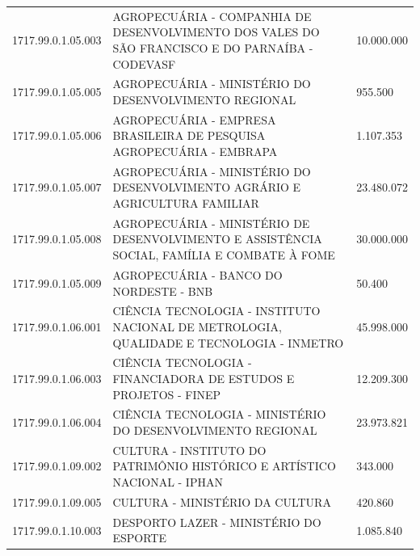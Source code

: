 \documentclass{article}
\begin{document}
\begin{longtable}[c]{m{2cm}|m{13cm}|m{2cm}}
\multicolumn{1}{C{2cm}|}{1717.99.0.1.05.003} & \multicolumn{1}{L{13cm}|}{AGROPECUÁRIA - COMPANHIA DE DESENVOLVIMENTO DOS VALES DO SÃO FRANCISCO E DO PARNAÍBA - CODEVASF} & \multicolumn{1}{R{2cm}}{10.000.000} \\
\multicolumn{1}{C{2cm}|}{1717.99.0.1.05.005} & \multicolumn{1}{L{13cm}|}{AGROPECUÁRIA - MINISTÉRIO DO DESENVOLVIMENTO REGIONAL} & \multicolumn{1}{R{2cm}}{955.500} \\
\multicolumn{1}{C{2cm}|}{1717.99.0.1.05.006} & \multicolumn{1}{L{13cm}|}{AGROPECUÁRIA - EMPRESA BRASILEIRA DE PESQUISA AGROPECUÁRIA - EMBRAPA} & \multicolumn{1}{R{2cm}}{1.107.353} \\
\multicolumn{1}{C{2cm}|}{1717.99.0.1.05.007} & \multicolumn{1}{L{13cm}|}{AGROPECUÁRIA - MINISTÉRIO DO DESENVOLVIMENTO AGRÁRIO E AGRICULTURA FAMILIAR} & \multicolumn{1}{R{2cm}}{23.480.072} \\
\multicolumn{1}{C{2cm}|}{1717.99.0.1.05.008} & \multicolumn{1}{L{13cm}|}{AGROPECUÁRIA - MINISTÉRIO DE DESENVOLVIMENTO E ASSISTÊNCIA SOCIAL, FAMÍLIA E COMBATE À FOME} & \multicolumn{1}{R{2cm}}{30.000.000} \\
\multicolumn{1}{C{2cm}|}{1717.99.0.1.05.009} & \multicolumn{1}{L{13cm}|}{AGROPECUÁRIA - BANCO DO NORDESTE - BNB} & \multicolumn{1}{R{2cm}}{50.400} \\
\multicolumn{1}{C{2cm}|}{1717.99.0.1.06.001} & \multicolumn{1}{L{13cm}|}{CIÊNCIA TECNOLOGIA - INSTITUTO NACIONAL DE METROLOGIA, QUALIDADE E TECNOLOGIA - INMETRO} & \multicolumn{1}{R{2cm}}{45.998.000} \\
\multicolumn{1}{C{2cm}|}{1717.99.0.1.06.003} & \multicolumn{1}{L{13cm}|}{CIÊNCIA TECNOLOGIA - FINANCIADORA DE ESTUDOS E PROJETOS - FINEP} & \multicolumn{1}{R{2cm}}{12.209.300} \\
\multicolumn{1}{C{2cm}|}{1717.99.0.1.06.004} & \multicolumn{1}{L{13cm}|}{CIÊNCIA TECNOLOGIA - MINISTÉRIO DO DESENVOLVIMENTO REGIONAL} & \multicolumn{1}{R{2cm}}{23.973.821} \\
\multicolumn{1}{C{2cm}|}{1717.99.0.1.09.002} & \multicolumn{1}{L{13cm}|}{CULTURA - INSTITUTO DO PATRIMÔNIO HISTÓRICO E ARTÍSTICO NACIONAL - IPHAN} & \multicolumn{1}{R{2cm}}{343.000} \\
\multicolumn{1}{C{2cm}|}{1717.99.0.1.09.005} & \multicolumn{1}{L{13cm}|}{CULTURA - MINISTÉRIO DA CULTURA} & \multicolumn{1}{R{2cm}}{420.860} \\
\multicolumn{1}{C{2cm}|}{1717.99.0.1.10.003} & \multicolumn{1}{L{13cm}|}{DESPORTO LAZER - MINISTÉRIO DO ESPORTE} & \multicolumn{1}{R{2cm}}{1.085.840} \\

\end{longtable}
\end{document}
